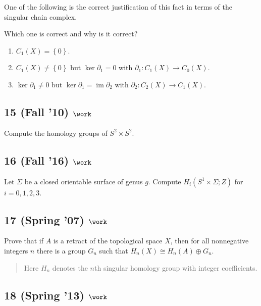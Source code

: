 One of the following is the correct justification of this fact in terms
of the singular chain complex.

Which one is correct and why is it correct?

\begin{enumerate}
\def\labelenumi{\alph{enumi}.}
\item
  \(C_1 (X) = \left\{{0}\right\}\).
\item
  \(C_1 (X) \neq \left\{{0}\right\}\) but \(\ker \partial_1 = 0\) with
  \(\partial_1 : C_1 (X) \to C_0 (X)\).
\item
  \(\ker \partial_1 \neq 0\) but
  \(\ker \partial_1 = \operatorname{im}\partial_2\) with
  \(\partial_2 : C_2 (X) \to C_1 (X)\).
\end{enumerate}

\hypertarget{fall-10-work-1}{%
\subsection{\texorpdfstring{15 (Fall '10)
\(\work\)}{15 (Fall '10) \textbackslash work}}\label{fall-10-work-1}}

Compute the homology groups of \(S^2 \times S^2\).

\hypertarget{fall-16-work-5}{%
\subsection{\texorpdfstring{16 (Fall '16)
\(\work\)}{16 (Fall '16) \textbackslash work}}\label{fall-16-work-5}}

Let \(\Sigma\) be a closed orientable surface of genus \(g\). Compute
\(H_i(S^1 \times \Sigma; Z)\) for \(i = 0, 1, 2, 3\).

\hypertarget{spring-07-work-2}{%
\subsection{\texorpdfstring{17 (Spring '07)
\(\work\)}{17 (Spring '07) \textbackslash work}}\label{spring-07-work-2}}

Prove that if \(A\) is a retract of the topological space \(X\), then
for all nonnegative integers \(n\) there is a group \(G_n\) such that
\(H_{n} (X) \cong H_{n} (A) \oplus G_n\).

\begin{quote}
Here \(H_{n}\) denotes the \(n\)th singular homology group with integer
coefficients.
\end{quote}

\hypertarget{spring-13-work-3}{%
\subsection{\texorpdfstring{18 (Spring '13)
\(\work\)}{18 (Spring '13) \textbackslash work}}\label{spring-13-work-3}}

